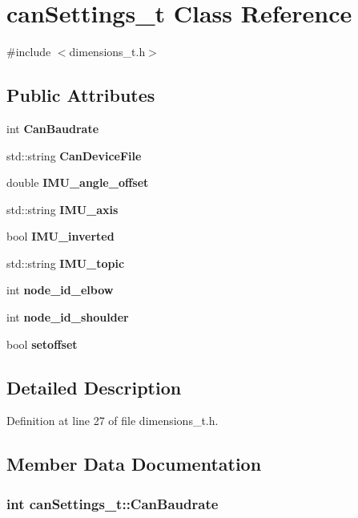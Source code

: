\section{can\-Settings\-\_\-t \-Class \-Reference}
\label{classcanSettings__t}


{\ttfamily \#include $<$dimensions\-\_\-t.\-h$>$}

\subsection*{\-Public \-Attributes}
\begin{DoxyCompactItemize}
\item 
int {\bf \-Can\-Baudrate}
\item 
std\-::string {\bf \-Can\-Device\-File}
\item 
double {\bf \-I\-M\-U\-\_\-angle\-\_\-offset}
\item 
std\-::string {\bf \-I\-M\-U\-\_\-axis}
\item 
bool {\bf \-I\-M\-U\-\_\-inverted}
\item 
std\-::string {\bf \-I\-M\-U\-\_\-topic}
\item 
int {\bf node\-\_\-id\-\_\-elbow}
\item 
int {\bf node\-\_\-id\-\_\-shoulder}
\item 
bool {\bf setoffset}
\end{DoxyCompactItemize}


\subsection{\-Detailed \-Description}


\-Definition at line 27 of file dimensions\-\_\-t.\-h.



\subsection{\-Member \-Data \-Documentation}
\subsubsection[{\-Can\-Baudrate}]{\setlength{\rightskip}{0pt plus 5cm}int {\bf can\-Settings\-\_\-t\-::\-Can\-Baudrate}}\label{classcanSettings__t_adb01b3c29accd5bb608ce94dcc9e231a}


